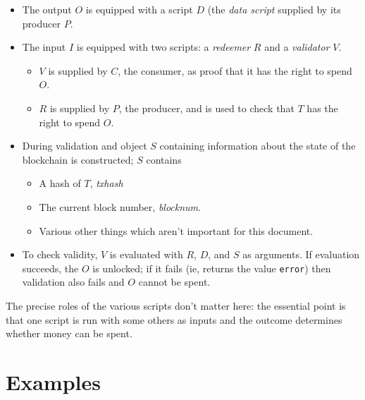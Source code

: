 \documentclass[a4paper]{article}
\begin{document}
\begin{itemize}
\item The output $O$ is equipped with a script $D$ (the \textit{data script} supplied by its producer $P$.
\item The input $I$ is equipped with two scripts: a \textit{redeemer} $R$ and a \textit{validator} $V$.
  \begin{itemize}
    \item $V$ is supplied by $C$, the consumer, as proof that it has the right to spend $O$.
    \item $R$ is supplied by $P$, the producer, and is used to check that $T$ has the right to spend $O$.
  \end{itemize}
\item During validation and object $S$ containing information about
  the state of the blockchain is constructed; $S$ contains
  \begin{itemize}
  \item A hash of $T$, \textit{txhash}
  \item The current block number, \textit{blocknum}.
  \item Various other things which aren't important for this document.
  \end{itemize}
\item To check validity, $V$ is evaluated with $R$, $D$, and $S$ as
  arguments.  If evaluation succeeds, the $O$ is unlocked; if it fails
  (ie, returns the value \texttt{error}) then validation also fails and $O$ cannot be spent.
\end{itemize}
The precise roles of the various scripts don't matter here: the
essential point is that one script is run with some others as inputs
and the outcome determines whether money can be spent.


\section{Examples}





%

%
\end{document}
